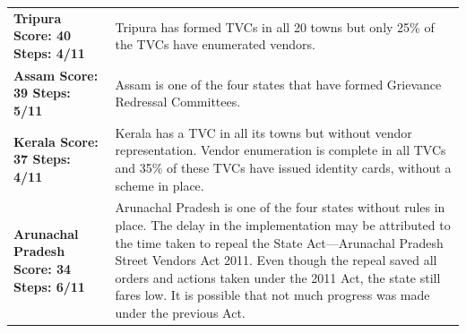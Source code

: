 \documentclass[a4paper, 12pt, twoside]{article}
\begin{document}
{\begin{longtable}[l]{>{\raggedright}p{4cm}>{\raggedright\arraybackslash}p{10cm}}
\\
\cellcolor{SVACyellow1}\bf{Tripura}
\newline
\bf{Score: 40}
\newline
\bf{Steps: 4/11}
&
\cellcolor{SVACyellow2}Tripura has formed TVCs in all 20 towns but only 25\% of the TVCs have enumerated vendors.
\\
\cellcolor{SVACyellow1}\bf{Assam}
\newline
\bf{Score: 39}
\newline
\bf{Steps: 5/11}
&
\cellcolor{SVACyellow2}Assam is one of the four states that have formed Grievance Redressal Committees.
\\
\cellcolor{SVACyellow1}\bf{Kerala}
\newline
\bf{Score: 37}
\newline
\bf{Steps: 4/11}
&
\cellcolor{SVACyellow2}Kerala has a TVC in all its towns but without vendor representation. Vendor enumeration is complete in all TVCs and 35\% of these TVCs have issued identity cards, without a scheme in place.
\\
\cellcolor{SVACyellow1}\bf{Arunachal Pradesh}
\newline
\bf{Score: 34}
\newline
\bf{Steps: 6/11}
&
\cellcolor{SVACyellow2}Arunachal Pradesh is one of the four states without rules in place. The delay in the implementation may be attributed to the time taken to repeal the State Act---Arunachal Pradesh Street Vendors Act 2011. Even though the repeal saved all orders and actions taken under the 2011 Act, the state still fares low. It is possible that not much progress was made under the previous Act.


\end{longtable}}
\end{document}
